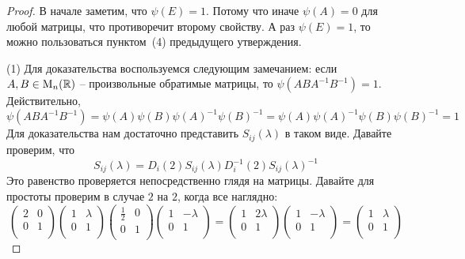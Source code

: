 \begin{proof}
В начале заметим, что $\psi(E) = 1$. Потому что иначе $\psi(A) = 0$ для любой матрицы, что противоречит второму свойству. А раз $\psi(E)=1$, то можно пользоваться пунктом~(4) предыдущего утверждения.

(1) Для доказательства воспользуемся следующим замечанием: если $A,B\in\operatorname{M}_{n}(\mathbb R)$ -- произвольные обратимые матрицы, то $\psi(ABA^{-1}B^{-1}) = 1$. Действительно, 
\[
\psi(ABA^{-1}B^{-1}) = \psi(A)\psi(B)\psi(A)^{-1}\psi(B)^{-1}=\psi(A)\psi(A)^{-1}\psi(B)\psi(B)^{-1} = 1
\]
Для доказательства нам достаточно представить $S_{ij}(\lambda)$ в таком виде. Давайте проверим, что 
\[
S_{ij}(\lambda) = D_i(2) S_{ij}(\lambda)D_i^{-1}(2)S_{ij}(\lambda)^{-1}
\]
Это равенство проверяется непосредственно глядя на матрицы. Давайте для простоты проверим в случае $2$ на $2$, когда все наглядно:
\[
\begin{pmatrix}
{2}&{0}\\
{0}&{1}\\
\end{pmatrix}
\begin{pmatrix}
{1}&{\lambda}\\
{0}&{1}\\
\end{pmatrix}
\begin{pmatrix}
{\frac{1}{2}}&{0}\\
{0}&{1}\\
\end{pmatrix}
\begin{pmatrix}
{1}&{-\lambda}\\
{0}&{1}\\
\end{pmatrix}
=
\begin{pmatrix}
{1}&{2\lambda}\\
{0}&{1}\\
\end{pmatrix}
\begin{pmatrix}
{1}&{-\lambda}\\
{0}&{1}\\
\end{pmatrix}
=
\begin{pmatrix}
{1}&{\lambda}\\
{0}&{1}\\
\end{pmatrix}
\]


\end{proof}

